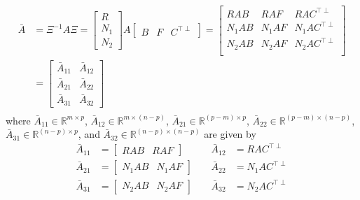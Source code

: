 \begin{equation}
  \label{eqn.Abar}
  \begin{split}
    \bar{A}
    &=
    \Xi^{-1}A\Xi=
    \begin{bmatrix}
      R \\
      N_{1} \\
      N_{2}
    \end{bmatrix}
    A
    \begin{bmatrix}
      B & F & C^{\top\perp}
    \end{bmatrix}
    =
    \begin{bmatrix}
      RAB & RAF & RAC^{\top\perp} \\
      N_{1}AB & N_{1}AF & N_{1}AC^{\top\perp} \\
      N_{2}AB & N_{2}AF & N_{2}AC^{\top\perp} \\
    \end{bmatrix} \\
    &=
    \left[
    \begin{array}{c|c} %
      \bar{A}_{11} & \bar{A}_{12} \\
      \hline %
      \bar{A}_{21} & \bar{A}_{22} \\
      \hline %
      \bar{A}_{31} & \bar{A}_{32}
    \end{array}\right] \\
  \end{split}
\end{equation}
where $\bar{A}_{11}\in\mathbb{R}^{m\times p}$, $\bar{A}_{12}\in\mathbb{R}^{m\times(n-p)}$, $\bar{A}_{21}\in\mathbb{R}^{(p-m)\times p}$, $\bar{A}_{22}\in\mathbb{R}^{(p-m)\times(n-p)}$, $\bar{A}_{31}\in\mathbb{R}^{(n-p)\times p}$, and $\bar{A}_{32}\in\mathbb{R}^{(n-p)\times(n-p)}$ are given by
\begin{equation}
  \label{eqn.AbarComponents}
  \begin{aligned}
    \bar{A}_{11}
    &=
    \begin{bmatrix}
      RAB & RAF
    \end{bmatrix}
    \qquad
    &
    \bar{A}_{12}
    &=
    RAC^{\top\perp} \\
    \bar{A}_{21}
    &=
    \begin{bmatrix}
      N_{1}AB & N_{1}AF
    \end{bmatrix}
    &
    \bar{A}_{22}
    &=
    N_{1}AC^{\top\perp} \\
    \bar{A}_{31}
    &=
    \begin{bmatrix}
      N_{2}AB & N_{2}AF
    \end{bmatrix}
    &
    \bar{A}_{32}
    &=
    N_{2}AC^{\top\perp}
  \end{aligned}
\end{equation}
